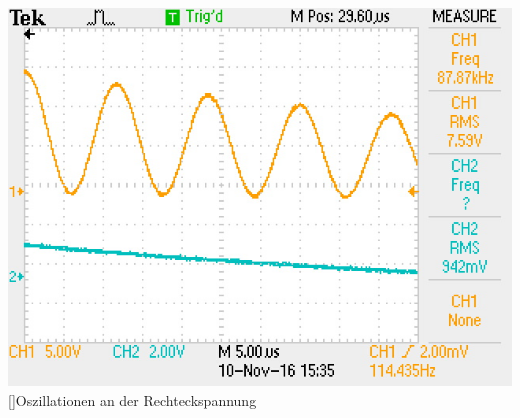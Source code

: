 \begin{center}
\includegraphics[scale=0.8]{Daten/Oszillation.JPG}
  []{Oszillationen an der Rechteckspannung} 
\end{center}
  
